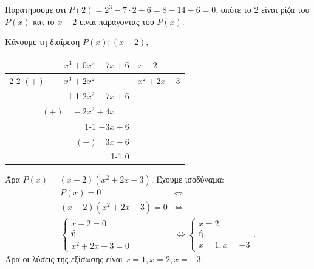 \begin{alist}
\item Παρατηρούμε ότι $P(2) = 2^3 - 7 \cdot 2 + 6 = 8 - 14 + 6 = 0$, οπότε το 2 είναι ρίζα του $P(x)$ και το $x-2$ είναι παράγοντας του $P(x)$.
\item Κάνουμε τη διαίρεση $P(x) : (x-2)$,
\begin{center}
\begin{tabular}{r|l}
$x^3 + 0x^2 - 7x + 6$ & $x - 2$ \\ \cline{2-2}
$(+) \quad -x^3 + 2x^2 \phantom{{} - 7x + 6}$ & $x^2 + 2x - 3$ \\ \cline{1-1}
$2x^2 - 7x + 6$ & \\
$(+) \quad -2x^2 + 4x \phantom{{} + 6}$ & \\ \cline{1-1}
$-3x + 6$ & \\
$(+) \quad 3x - 6$ & \\ \cline{1-1}
$0$ &
\end{tabular}
\end{center}
Άρα $P(x) = (x-2)(x^2 + 2x - 3)$. Έχουμε ισοδύναμα:
\begin{align*}
P(x) = 0 &\Leftrightarrow \\
(x-2)(x^2 + 2x - 3) = 0 &\Leftrightarrow \\
\begin{cases} x - 2 = 0 \\ \text{ή} \\ x^2 + 2x - 3 = 0 \end{cases} &\Leftrightarrow
\begin{cases} x = 2 \\ \text{ή} \\ x = 1, x = -3 \end{cases}.
\end{align*}
Άρα οι λύσεις της εξίσωσης είναι $x = 1, x = 2, x = -3$.
\end{alist}

